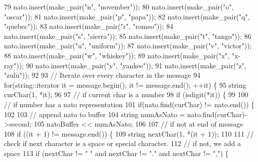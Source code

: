 \begin{DoxyCode}
79     nato.insert(make\_pair(\textcolor{stringliteral}{"n"}, \textcolor{stringliteral}{"november"}));
80     nato.insert(make\_pair(\textcolor{stringliteral}{"o"}, \textcolor{stringliteral}{"oscar"}));
81     nato.insert(make\_pair(\textcolor{stringliteral}{"p"}, \textcolor{stringliteral}{"papa"}));
82     nato.insert(make\_pair(\textcolor{stringliteral}{"q"}, \textcolor{stringliteral}{"quebec"}));
83     nato.insert(make\_pair(\textcolor{stringliteral}{"r"}, \textcolor{stringliteral}{"romeo"}));
84     nato.insert(make\_pair(\textcolor{stringliteral}{"s"}, \textcolor{stringliteral}{"sierra"}));
85     nato.insert(make\_pair(\textcolor{stringliteral}{"t"}, \textcolor{stringliteral}{"tango"}));
86     nato.insert(make\_pair(\textcolor{stringliteral}{"u"}, \textcolor{stringliteral}{"uniform"}));
87     nato.insert(make\_pair(\textcolor{stringliteral}{"v"}, \textcolor{stringliteral}{"victor"}));
88     nato.insert(make\_pair(\textcolor{stringliteral}{"w"}, \textcolor{stringliteral}{"whiskey"}));
89     nato.insert(make\_pair(\textcolor{stringliteral}{"x"}, \textcolor{stringliteral}{"x-ray"}));
90     nato.insert(make\_pair(\textcolor{stringliteral}{"y"}, \textcolor{stringliteral}{"yankee"}));
91     nato.insert(make\_pair(\textcolor{stringliteral}{"z"}, \textcolor{stringliteral}{"zulu"}));
92 
93     \textcolor{comment}{// Iterate over every character in the message}
94     \textcolor{keywordflow}{for}(string::iterator it = message.begin(); it != message.end(); ++it) \{
95         \textcolor{keywordtype}{string} curChar(1, *it);
96 
97         \textcolor{comment}{// if current char is a number}
98         \textcolor{keywordflow}{if} (isdigit(*it)) \{
99 
100             \textcolor{comment}{// if number has a nato representation}
101             \textcolor{keywordflow}{if}(nato.find(curChar) != nato.end()) \{
102 
103                 \textcolor{comment}{// append nato to buffer}
104                 \textcolor{keywordtype}{string} numAsNato = nato.find(curChar)->second;
105                 natoBuffer << numAsNato;
106 
107                 \textcolor{comment}{// if not at end of message}
108                 \textcolor{keywordflow}{if} ((it + 1) != message.end()) \{
109                     \textcolor{keywordtype}{string} nextChar(1, *(it + 1));
110 
111                     \textcolor{comment}{// check if next character is a space or special character.}
112                     \textcolor{comment}{// if not, we add a space}
113                     \textcolor{keywordflow}{if} (nextChar != \textcolor{stringliteral}{" "} and nextChar != \textcolor{stringliteral}{"."} and nextChar != \textcolor{stringliteral}{","}) \{

\end{DoxyCode}
